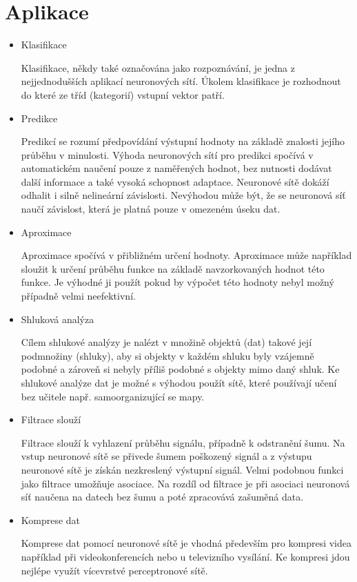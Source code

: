 \documentclass[11pt,twoside,a4paper]{book}
\begin{document}
\section{Aplikace}

\begin{itemize}
\item Klasifikace

Klasifikace, někdy také označována jako rozpoznávání, je jedna z nejjednodušších aplikací neuronových sítí. Úkolem klasifikace je rozhodnout do které ze tříd (kategorií) vstupní vektor patří.
\newpage
\item Predikce

Predikcí se rozumí předpovídání výstupní hodnoty na základě znalosti jejího průběhu v minulosti. Výhoda neuronových sítí pro predikci spočívá v automatickém naučení pouze z naměřených hodnot, bez nutnosti dodávat další informace a také vysoká schopnost adaptace. Neuronové sítě dokáží odhalit i silně nelineární závislosti. Nevýhodou může být, že se neuronová síť naučí závislost, která je platná pouze v omezeném úseku dat. 
\item Aproximace

Aproximace spočívá v přibližném určení hodnoty. Aproximace může například sloužit k určení průběhu funkce na základě navzorkovaných hodnot této funkce. Je výhodné ji použít pokud by výpočet této hodnoty nebyl možný případně velmi neefektivní.
\item Shluková analýza

Cílem shlukové analýzy je nalézt v množině objektů (dat) takové její podmnožiny (shluky), aby si objekty v každém shluku byly vzájemně podobné a zároveň si nebyly příliš podobné s objekty mimo daný shluk. Ke shlukové analýze dat je možné s výhodou použít sítě, které používají učení bez učitele např. samoorganizující se mapy.
\item Filtrace slouží

Filtrace slouží k vyhlazení průběhu signálu, případně k odstranění šumu. Na vstup neuronové sítě se přivede šumem poškozený signál a z výstupu neuronové sítě je získán nezkreslený výstupní signál. Velmi podobnou funkci jako filtrace umožňuje asociace. Na rozdíl od filtrace je při asociaci neuronová síť naučena na datech bez šumu a poté zpracovává zašuměná data.
\item Komprese dat

Komprese dat pomocí neuronové sítě je vhodná především pro kompresi videa například při videokonferencích nebo u televizního vysílání. Ke kompresi jdou nejlépe využít vícevrstvé perceptronové sítě.
\end{itemize}
\end{document}
